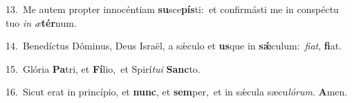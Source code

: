 {\numbfont\textcolor{\numbcolor}{13.}}~Me autem propter innocéntiam \textbf{su}\-sce\-\textbf{pís}\-ti:~\star et confirmásti me in conspéctu tuo \textit{in} \textit{æ}\-\textbf{tér}num.\par
{\numbfont\textcolor{\numbcolor}{14.}}~Benedíctus Dóminus, Deus Israël, a sǽculo et \textbf{us}\-que in \textbf{sǽ}\-culum:~\star \textit{fi}\-\textit{at}, \textbf{fi}\-at.\par
{\numbfont\textcolor{\numbcolor}{15.}}~Glória \textbf{Pa}\-tri, et \textbf{Fí}\-lio,~\star et Spirí\-\textit{tu}\-\textit{i} \textbf{Sanc}\-to.\par
{\numbfont\textcolor{\numbcolor}{16.}}~Sicut erat in princípio, et \textbf{nunc}\-, et \textbf{sem}\-per,~\star et in sǽcula sæcu\-\textit{ló}\-\textit{rum}. \textbf{A}\-men.\par
